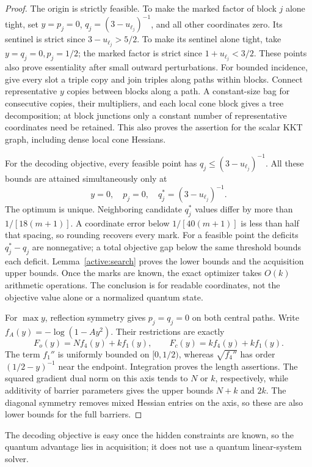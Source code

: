 \begin{proof}
The origin is strictly feasible. To make the marked factor of block $j$ alone
tight, set $y=p_j=0$, $q_j=(3-u_{\ell_j})^{-1}$, and all other
coordinates zero. Its sentinel is strict since $3-u_{\ell_j}>5/2$.
To make its sentinel alone tight, take $y=q_j=0,p_j=1/2$;
the marked factor is strict since $1+u_{\ell_j}<3/2$.
These points also prove essentiality after small outward perturbations.
For bounded incidence, give every slot a triple copy and join triples
along paths within blocks. Connect representative $y$ copies between
blocks along a path. A constant-size bag for consecutive copies,
their multipliers, and each local cone block gives a tree
decomposition; at block junctions only a constant number of
representative coordinates need be retained. This also proves the
assertion for the scalar KKT graph, including dense local cone Hessians.

For the decoding objective, every feasible point has
$q_j\leq(3-u_{\ell_j})^{-1}$. All these bounds are attained
simultaneously only at
\[
 y=0,\quad p_j=0,\quad q_j^*=(3-u_{\ell_j})^{-1}.
\]
The optimum is unique. Neighboring candidate $q_j^*$ values differ
by more than $1/[18(m+1)]$. A coordinate error below
$1/[40(m+1)]$ is less than half that spacing, so rounding recovers
every mark. For a feasible point the deficits $q_j^*-q_j$ are
nonnegative; a total objective gap below the same threshold bounds
each deficit. Lemma~\ref{active:search} proves the lower bounds and
the acquisition upper bounds. Once the marks are known, the exact
optimizer takes $O(k)$ arithmetic operations. The conclusion is for
readable coordinates, not the objective value alone or a normalized
quantum state.

For $\max y$, reflection symmetry gives $p_j=q_j=0$ on both
central paths. Write $f_A(y)=-\log(1-Ay^2)$. Their restrictions are
exactly
\[
 F_o(y)=Nf_4(y)+kf_1(y),\qquad
 F_c(y)=kf_4(y)+kf_1(y).
\]
The term $f_1''$ is uniformly bounded on $[0,1/2)$, whereas
$\sqrt{f_4''}$ has order $(1/2-y)^{-1}$ near the endpoint.
Integration proves the length assertions. The squared gradient dual
norm on this axis tends to $N$ or $k$, respectively, while
additivity of barrier parameters gives the upper bounds $N+k$ and $2k$.
The diagonal symmetry removes mixed Hessian entries on the axis,
so these are also lower bounds for the full barriers.
\end{proof}

The decoding objective is easy once the hidden constraints are known,
so the quantum advantage lies in acquisition; it does not use a
quantum linear-system solver.

